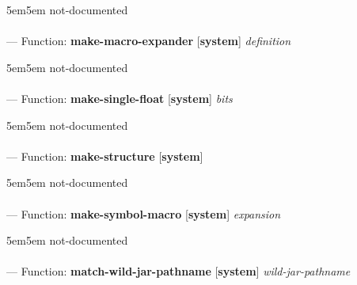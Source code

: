 \begin{adjustwidth}{5em}{5em}
not-documented
\end{adjustwidth}

\paragraph{}
\label{SYSTEM:MAKE-MACRO-EXPANDER}
--- Function: \textbf{make-macro-expander} [\textbf{system}] \textit{definition}

\begin{adjustwidth}{5em}{5em}
not-documented
\end{adjustwidth}

\paragraph{}
\label{SYSTEM:MAKE-SINGLE-FLOAT}
--- Function: \textbf{make-single-float} [\textbf{system}] \textit{bits}

\begin{adjustwidth}{5em}{5em}
not-documented
\end{adjustwidth}

\paragraph{}
\label{SYSTEM:MAKE-STRUCTURE}
--- Function: \textbf{make-structure} [\textbf{system}] \textit{}

\begin{adjustwidth}{5em}{5em}
not-documented
\end{adjustwidth}

\paragraph{}
\label{SYSTEM:MAKE-SYMBOL-MACRO}
--- Function: \textbf{make-symbol-macro} [\textbf{system}] \textit{expansion}

\begin{adjustwidth}{5em}{5em}
not-documented
\end{adjustwidth}

\paragraph{}
\label{SYSTEM:MATCH-WILD-JAR-PATHNAME}
--- Function: \textbf{match-wild-jar-pathname} [\textbf{system}] \textit{wild-jar-pathname}

